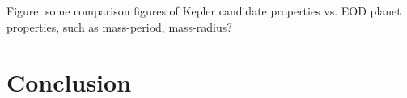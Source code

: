 \documentclass[11pt,preprint]{aastex}
\begin{document}
\begin{CJK*}{UTF8}{gbsn}
Figure: some comparison figures of Kepler candidate properties
vs. EOD planet properties, such as mass-period, mass-radius?


\section{Conclusion}\label{sec:conclusion}



\acknowledgments






\clearpage


\end{CJK*}
\end{document}
